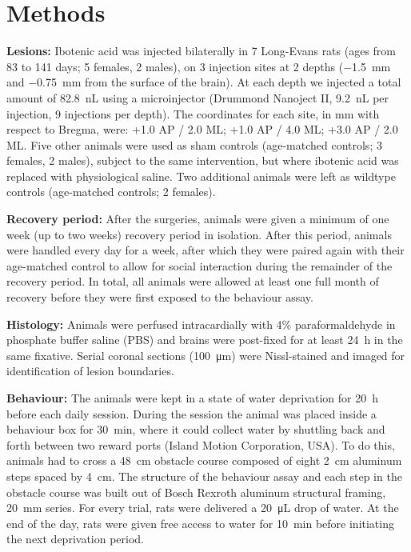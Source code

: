 \section{Methods}

\textbf{Lesions:} Ibotenic acid was injected bilaterally in 7 Long-Evans rats (ages from 83 to 141 days; 5 females, 2 males), on 3 injection sites at 2 depths (\SI{-1.5}{\milli\meter} and \SI{-0.75}{\milli\meter} from the surface of the brain). At each depth we injected a total amount of \SI{82.8}{\nano\liter} using a microinjector (Drummond Nanoject II, \SI{9.2}{\nano\liter} per injection, 9 injections per depth). The coordinates for each site, in \si{\milli\meter} with respect to Bregma, were: +1.0 AP / 2.0 ML; +1.0 AP / 4.0 ML; +3.0 AP / 2.0 ML. Five other animals were used as sham controls (age-matched controls; 3 females, 2 males), subject to the same intervention, but where ibotenic acid was replaced with physiological saline. Two additional animals were left as wildtype controls (age-matched controls; 2 females).

\textbf{Recovery period:} After the surgeries, animals were given a minimum of one week (up to two weeks) recovery period in isolation. After this period, animals were handled every day for a week, after which they were paired again with their age-matched control to allow for social interaction during the remainder of the recovery period. In total, all animals were allowed at least one full month of recovery before they were first exposed to the behaviour assay.

\textbf{Histology:} Animals were perfused intracardially with 4\% paraformaldehyde in phosphate buffer saline (PBS) and brains were post-fixed for at least \SI{24}{\hour} in the same fixative. Serial coronal sections (\SI{100}{\micro\meter}) were Nissl-stained and imaged for identification of lesion boundaries.

\textbf{Behaviour:} The animals were kept in a state of water deprivation for \SI{20}{\hour} before each daily session. During the session the animal was placed inside a behaviour box for \SI{30}{\minute}, where it could collect water by shuttling back and forth between two reward ports (Island Motion Corporation, USA). To do this, animals had to cross a \SI{48}{\centi\meter} obstacle course composed of eight \SI{2}{\centi\meter} aluminum steps spaced by \SI{4}{\centi\meter}. The structure of the behaviour assay and each step in the obstacle course was built out of Bosch Rexroth aluminum structural framing, \SI{20}{\milli\meter} series. For every trial, rats were delivered a \SI{20}{\micro\liter} drop of water. At the end of the day, rats were given free access to water for \SI{10}{\minute} before initiating the next deprivation period.

